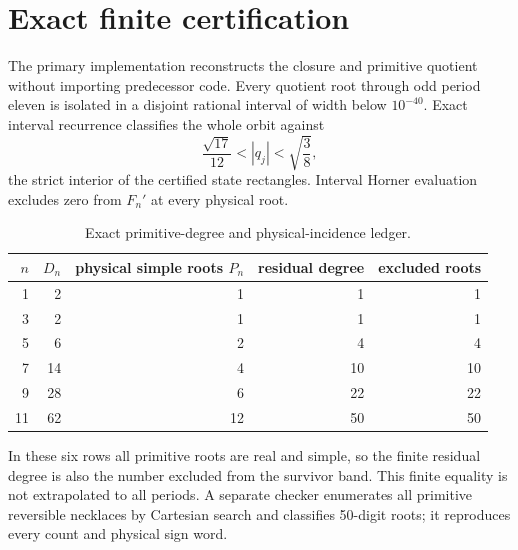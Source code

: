 \section{Exact finite certification}

The primary implementation reconstructs the closure and primitive quotient
without importing predecessor code.  Every quotient root through odd period
eleven is isolated in a disjoint rational interval of width below $10^{-40}$.
Exact interval recurrence classifies the whole orbit against
\[
\frac{\sqrt{17}}{12}<|q_j|<\sqrt{\frac38},
\]
the strict interior of the certified state rectangles.  Interval Horner
evaluation excludes zero from $F_n'$ at every physical root.

\begin{table}[ht]
\centering
\caption{Exact primitive-degree and physical-incidence ledger.}
\begin{tabular}{rrrrr}
\toprule
$n$ & $D_n$ & physical simple roots $P_n$ & residual degree & excluded roots\\
\midrule
1&2&1&1&1\\
3&2&1&1&1\\
5&6&2&4&4\\
7&14&4&10&10\\
9&28&6&22&22\\
11&62&12&50&50\\
\bottomrule
\end{tabular}
\end{table}

In these six rows all primitive roots are real and simple, so the finite
residual degree is also the number excluded from the survivor band.  This
finite equality is not extrapolated to all periods.  A separate checker
enumerates all primitive reversible necklaces by Cartesian search and
classifies 50-digit roots; it reproduces every count and physical sign word.
